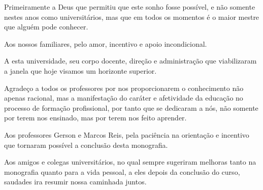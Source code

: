 Primeiramente a Deus que permitiu que este sonho fosse possível, e não somente nestes anos como universitários, mas que em todos os momentos é o maior mestre que alguém pode conhecer.
	
Aos nossos familiares, pelo amor, incentivo e apoio incondicional.

A esta universidade, seu corpo docente, direção e administração que viabilizaram a janela que hoje visamos um horizonte superior.

Agradeço a todos os professores por nos proporcionarem o conhecimento não apenas racional, mas a manifestação do caráter e afetividade da educação no processo de formação profissional, por tanto que se dedicaram a nós, não somente por terem nos ensinado, mas por terem nos feito aprender.

Aos professores Gerson e Marcos Reis, pela paciência na orientação e incentivo que tornaram possível a conclusão desta monografia. 

Aos amigos e colegas universitários, no qual sempre sugeriram melhoras tanto na monografia quanto para a vida pessoal, a eles depois da conclusão do curso, saudades ira resumir nossa caminhada juntos. 